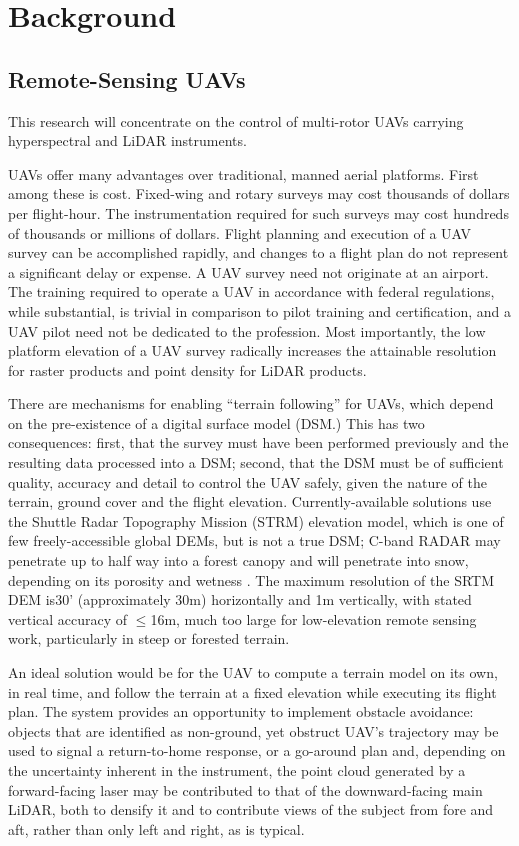 \documentclass[10pt,a4paper]{report}
\begin{document}
\section{Background}

\subsection{Remote-Sensing UAVs}

This research will concentrate on the control of multi-rotor UAVs carrying hyperspectral and LiDAR instruments.

UAVs offer many advantages over traditional, manned aerial platforms. First among these is cost. Fixed-wing and rotary surveys may cost thousands of dollars per flight-hour. The instrumentation required for such surveys may cost hundreds of thousands or millions  of dollars. Flight planning and execution of a UAV survey can be accomplished rapidly, and changes to a flight plan do not represent a significant delay or expense. A UAV survey need not originate at an airport. The training required to operate a UAV in accordance with federal regulations, while substantial, is trivial in comparison to pilot training and certification, and a UAV pilot need not be dedicated to the profession. Most importantly, the low platform elevation of a UAV survey radically increases the attainable resolution for raster products and point density for LiDAR products.

There are mechanisms for enabling “terrain following” for UAVs, which depend on the pre-existence of a digital surface model (DSM.) This has two consequences: first, that the survey must have been performed previously and the resulting data processed into a DSM; second, that the DSM must be of sufficient quality, accuracy and detail to control the UAV safely, given the nature of the terrain, ground cover and the flight elevation. Currently-available solutions use the Shuttle Radar Topography Mission (STRM) elevation model, which is one of few freely-accessible global DEMs, but is not a true DSM; C-band RADAR may penetrate up to half way into a forest canopy \cite{Carabajal2005} and will penetrate into snow, depending on its porosity and wetness \cite{Tighe2009}. The maximum resolution of the SRTM DEM is30' (approximately 30m) horizontally and 1m vertically, with stated vertical accuracy of $\leq$16m, much too large for low-elevation remote sensing work, particularly in steep or forested terrain.  

An ideal solution would be for the UAV to compute a terrain model on its own, in real time, and follow the terrain at a fixed elevation while executing its flight plan. The system provides an opportunity to implement obstacle avoidance: objects that are identified as non-ground, yet obstruct UAV’s trajectory may be used to signal a return-to-home response, or a go-around plan and, depending on the uncertainty inherent in the instrument, the point cloud generated by a forward-facing laser may be contributed to that of the downward-facing main LiDAR, both to densify it and to contribute views of the subject from fore and aft, rather than only left and right, as is typical. 
\end{document}
